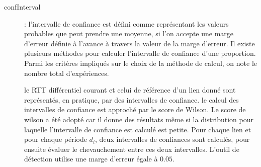 \begin{description}
\item[confInterval] : l'intervalle de confiance  est défini comme représentant les valeurs probables que peut prendre une moyenne, si l'on accepte une marge d'erreur définie à l'avance à travers la valeur de la marge d'erreur. Il existe plusieurs méthodes pour calculer l'intervalle de confiance d'une proportion. Parmi les critères impliqués sur le choix de la méthode de calcul, on note le nombre total d'expériences.

le RTT différentiel courant et  celui de référence d'un lien donné sont représentés, en pratique, par des intervalles de confiance.  le calcul des intervalles de confiance  est approché par le score de Wilson. Le score de wilson a été adopté car il donne des résultats même si la distribution pour laquelle l'intervalle de confiance est calculé est petite. Pour chaque lien et pour chaque période $d_i$,  deux intervalles de confiances sont calculés, pour ensuite évaluer le chevauchement entre ces deux intervalles. L'outil de détection utilise une marge d'erreur égale à  $ 0.05 $.





\end{description}
